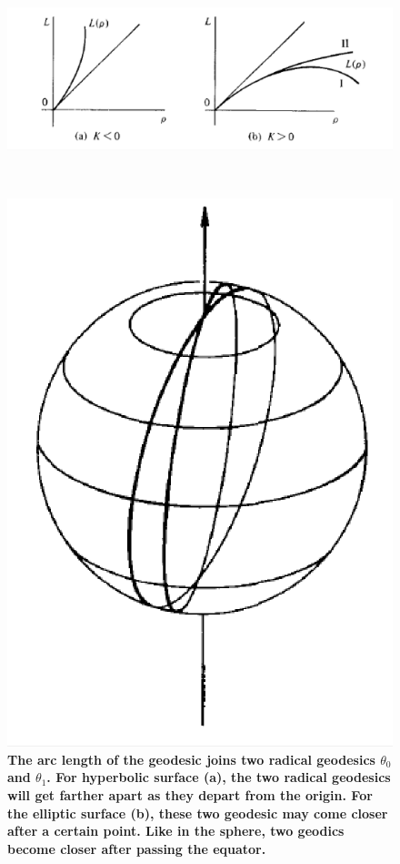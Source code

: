 \documentclass[11pt]{article}
\begin{document}
\begin{itemize}
\begin{figure}[tbh]
\centering
\begin{minipage}{0.6\linewidth}
 \centerline{\includegraphics[scale = 0.43]{arc_length_geodesic.png}}
\end{minipage}\\
\begin{minipage}{0.6\linewidth}
 \centerline{\includegraphics[scale = 0.43]{arc_length_geodesic2.png}}
\end{minipage}
\caption{\scriptsize
\textbf{The arc length of the geodesic joins two radical geodesics $\theta_{0}$ and $\theta_{1}$. For hyperbolic surface (a), the two radical geodesics will get farther apart as they depart from the origin. For the elliptic surface (b), these two geodesic may come closer after a certain point. Like in the sphere, two geodics become closer after passing the equator. }}
\label{fig: arc_length_geo}
\end{figure}


\end{itemize}
\end{document}
